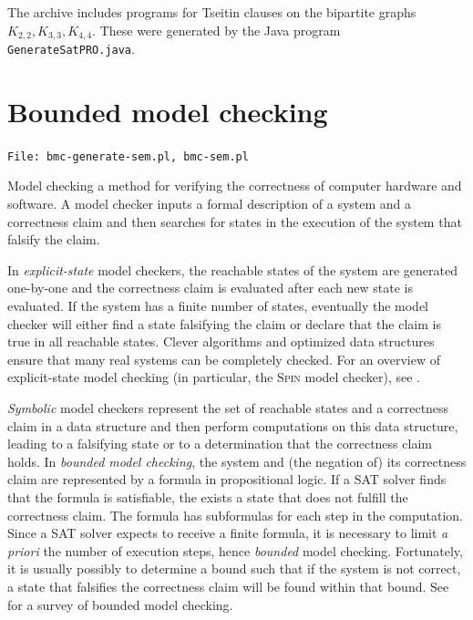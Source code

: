 \documentclass[11pt]{report}
\newcommand*{\p}[1]{\textup{\texttt{#1}}}
\newcommand*{\fl}[1]{\parbox{\textwidth}{\raggedleft \p{File: #1}}}
\begin{document}
\bigskip

The archive includes programs for Tseitin clauses on the bipartite graphs $K_{2,2}, K_{3,3}, K_{4,4}$. These were generated by the Java program \texttt{GenerateSatPRO.java}.


\chapter{Bounded model checking}\label{ch.model}

\fl{bmc-generate-sem.pl, bmc-sem.pl}

Model checking a method for verifying the correctness of computer
hardware and software. A model checker inputs a formal description of a
system and a correctness claim and then searches for states in the
execution of the system that falsify the claim.

In \emph{explicit-state} model checkers, the reachable states of the
system are generated one-by-one and the correctness claim is evaluated
after each new state is evaluated. If the system has a finite number of
states, eventually the model checker will either find
a state falsifying the claim or declare that the claim is true in all
reachable states. Clever algorithms and optimized data structures ensure
that many real systems can be completely checked. For an overview of
explicit-state model checking (in particular, the \textsc{Spin} model
checker), see \cite{primer}.

\emph{Symbolic} model checkers represent the set of reachable states and
a correctness claim in a data structure and then perform computations on
this data structure, leading to a falsifying state or to a determination
that the correctness claim holds. In \emph{bounded model checking}, the
system and (the negation of) its correctness claim are represented by a
formula in propositional logic. If a SAT solver finds that the formula
is satisfiable, the exists a state that does not fulfill the correctness
claim. The formula has subformulas for each step in the computation.
Since a SAT solver expects to receive a finite formula, it is necessary
to limit \textit{a priori} the number of execution steps, hence
\emph{bounded} model checking. Fortunately, it is usually possibly to
determine a bound such that if the system is not correct, a state that
falsifies the correctness claim will be found within that bound. See
\cite{bmc} for a survey of bounded model checking.
\end{document}
